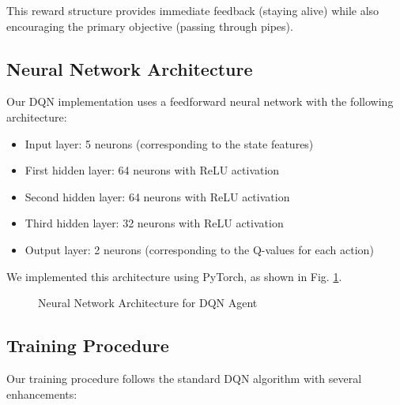 \documentclass[conference]{IEEEtran}
\begin{document}
This reward structure provides immediate feedback (staying alive) while also encouraging the primary objective (passing through pipes).

\subsection{Neural Network Architecture}
Our DQN implementation uses a feedforward neural network with the following architecture:
\begin{itemize}
    \item Input layer: 5 neurons (corresponding to the state features)
    \item First hidden layer: 64 neurons with ReLU activation
    \item Second hidden layer: 64 neurons with ReLU activation
    \item Third hidden layer: 32 neurons with ReLU activation
    \item Output layer: 2 neurons (corresponding to the Q-values for each action)
\end{itemize}

We implemented this architecture using PyTorch, as shown in Fig. \ref{fig:nn_architecture}.

\begin{figure}[!t]
\centering
{}
\caption{Neural Network Architecture for DQN Agent}
\label{fig:nn_architecture}
\end{figure}

\subsection{Training Procedure}
Our training procedure follows the standard DQN algorithm with several enhancements:
\end{document}

